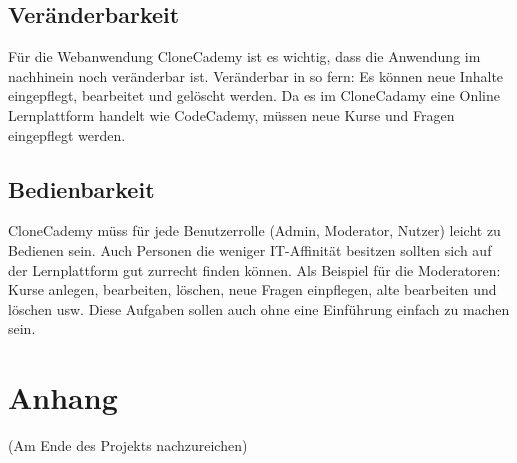 \documentclass[accentcolor=tud0b,12pt,paper=a4]{tudreport}
\begin{document}
        \section{Veränderbarkeit}
                Für die Webanwendung CloneCademy ist es wichtig, dass die Anwendung im nachhinein noch veränderbar ist. Veränderbar in so fern: Es können neue Inhalte eingepflegt, bearbeitet und gelöscht werden. Da es im CloneCadamy eine Online Lernplattform handelt wie CodeCademy, müssen neue Kurse und Fragen eingepflegt werden.

        \section{Bedienbarkeit}
                CloneCademy müss für jede Benutzerrolle (Admin, Moderator, Nutzer) leicht zu Bedienen sein. Auch Personen die weniger IT-Affinität besitzen sollten sich auf der Lernplattform gut zurrecht finden können. Als Beispiel für die Moderatoren: Kurse anlegen, bearbeiten, löschen, neue Fragen einpflegen, alte bearbeiten und löschen usw. Diese Aufgaben sollen auch ohne eine Einführung einfach zu machen sein.



\appendix
	\chapter{Anhang}
		(Am Ende des Projekts nachzureichen)\\
\end{document}
